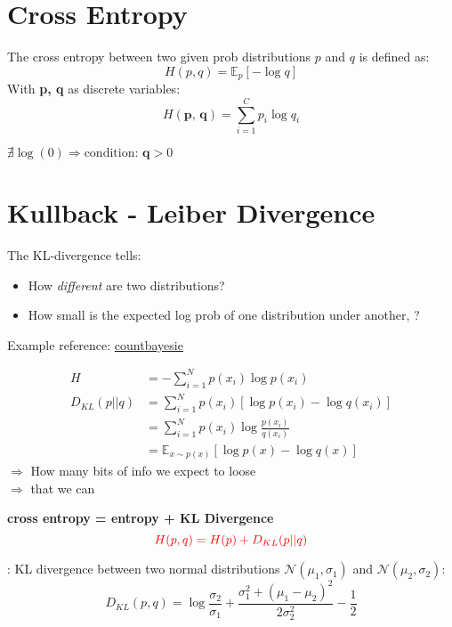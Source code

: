 \section{Cross Entropy}
\label{sec:cross-entropy}
The cross entropy between two given \ac{prob} distributions $p$ and $q$ is defined as:
\begin{equation}
	H(p, q) = \mathbb{E}_p[-\log q]
\end{equation}
With \textbf{p, q} as discrete variables:
\begin{equation}
	H(\textbf{p, q}) = \sum_{i=1}^{C} p_i \log q_i
\end{equation}

\note $\nexists \log (0) \Rightarrow \text{condition: } \textbf{q} >0$

\section{Kullback - Leiber Divergence}

The \ac{KL}-divergence tells:
\begin{itemize}
	\item How \textit{different} are two distributions?
	\item How small is the expected log \ac{prob} of one distribution under another, ?
\end{itemize}

Example reference: 	\href{https://www.countbayesie.com/blog/2017/5/9/kullback-leibler-divergence-explained}{countbayesie}

\begin{align}
	H &= - \sum_{i=1}^{N} p(x_i) \log p(x_i)\\
	D_{KL}(p || q) &= \sum_{i=1}^N p(x_i) \left[ \log p(x_i) - \log q(x_i) \right]\\
	&= \sum_{i=1}^N p(x_i) \log \frac{p(x_i)}{q(x_i)}\\
	&= \mathbb{E}_{x \sim p(x)} \left[ \log p(x) - \log q(x) \right]
\end{align}
$\Rightarrow$ How many bits of info we expect to loose\\
$\Rightarrow$  that we can 

\textbf{\color{red} cross entropy = entropy + KL Divergence}
\begin{equation}
	{\color{red} H(p, q) = H(p) + D_{KL}(p || q)}
\end{equation}

\Eg: KL divergence between two normal distributions $\mathcal{N}(\mu_1, \sigma_1)$ and $\mathcal{N}(\mu_2, \sigma_2)$:
\begin{equation}
	D_{KL}(p, q) = \log \frac{\sigma_2}{\sigma_1} + \frac{\sigma_1^2 + (\mu_1 - \mu_2)^2}{2 \sigma_2^2} - \frac{1}{2}
\end{equation}

